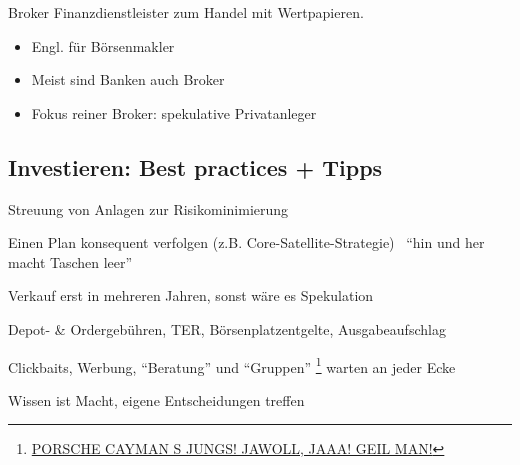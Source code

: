 \documentclass{beamer}
\let\oldfootnote\footnote
\renewcommand{\footnote}[1]
{%
	\oldfootnote
	{
		\tiny
		\textcolor{gray}{#1}
	}%
}
\begin{document}
			\begin{frame}{Broker}
				Finanzdienstleister zum Handel mit Wertpapieren.
				\begin{itemize}
					\item Engl. für Börsenmakler
					\item Meist sind Banken auch Broker
					\item Fokus reiner Broker: spekulative Privatanleger
				\end{itemize}
			\end{frame}
		
		\subsection{Investieren: Best practices + Tipps}
		
			\begin{frame}
				\begin{description}[labelwidth=0cm]
					\item[Diversifikation] Streuung von Anlagen zur Risikominimierung
					\item[Strategie] Einen Plan konsequent verfolgen (z.B. Core-Satellite-Strategie) \textrightarrow\  "`hin und her macht Taschen leer"'
					\item[Geduld] Verkauf erst in mehreren Jahren, sonst wäre es Spekulation
					\item[Gebühren] Depot- \& Ordergebühren, TER, Börsenplatzentgelte, Ausgabeaufschlag
					\item[Nachdenken] Clickbaits, Werbung, "`Beratung"' und "`Gruppen"'\footnote{\href{https://www.youtube.com/watch?v=dM-8-KuKprA}{PORSCHE CAYMAN S JUNGS! JAWOLL, JAAA! GEIL MAN!}} warten an jeder Ecke
					\item[Bildung] Wissen ist Macht, eigene Entscheidungen treffen
				\end{description}
			\end{frame}
		
\end{document}
